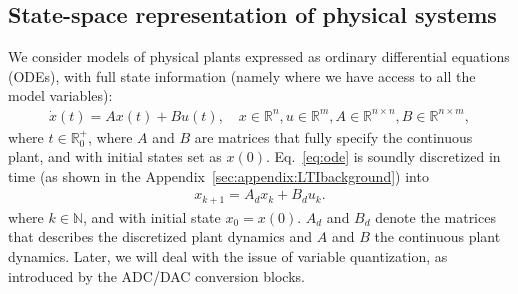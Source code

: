 \documentclass[runningheads,a4paper]{llncs}
\begin{document}
\subsection{State-space representation of physical systems} 
\label{ssec:ssrepresentation}

We consider models of physical plants expressed as ordinary differential equations (ODEs), 
with full state information (namely where we have access to all the model variables):  
%
\begin{align}
\label{eq:ode}
\dot{x}(t) = Ax(t)+ B u(t), \quad x \in \mathbb{R}^{n}, u \in \mathbb{R}^m, A \in \mathbb{R}^{n \times n}, B \in \mathbb{R}^{n \times m}, 
\end{align}
where $t \in \mathbb R_0^+$, 
where $A$ and $B$ are matrices that fully specify the continuous plant, 
and with initial states set as $x(0)$. 
Eq.~\eqref{eq:ode} is soundly discretized in time (as shown in the Appendix~\ref{sec:appendix:LTIbackground}) into %
%
\begin{align}
\label{eq:plant}
x_{k+1} = A_d x_k+ B_d u_k. 
\end{align} 
where $k \in \mathbb N$, 
and with initial state $x_{0}=x(0)$. $A_d$ and $B_d$ denote the matrices that describes the discretized plant dynamics and $A$ and $B$ the continuous plant dynamics. 
Later, we will deal with the issue of variable quantization, as introduced by the ADC/DAC conversion blocks.  
\end{document}
